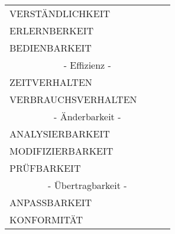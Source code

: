 \documentclass[a4paper]{scrreprt}
\begin{document}
\begin{table}[h!]
\begin{tabular}{llll}
    			VERSTÄNDLICHKEIT                             &                                        &                                   &                                      \\
    			ERLERNBERKEIT                                &                                        &                                   &                                      \\
    			BEDIENBARKEIT                                &                                        &                                   &                                      \\
    			\multicolumn{4}{c}{- Effizienz -}\\
    			ZEITVERHALTEN                                &                                        &                                   &                                      \\
    			VERBRAUCHSVERHALTEN                          &                                        &                                   &                                      \\
    			\multicolumn{4}{c}{- Änderbarkeit -}\\
    			ANALYSIERBARKEIT                             &                                        &                                   &                                      \\
    			MODIFIZIERBARKEIT                            &                                        &                                   &                                      \\
    			PRÜFBARKEIT                                  &                                        &                                   &                                      \\
    			\multicolumn{4}{c}{- Übertragbarkeit -}\\
    			ANPASSBARKEIT                                &                                        &                                   &                                      \\
    			KONFORMITÄT                                  &                                        &                                   &                                     
    		\end{tabular}
    	\end{table}
\end{document}
